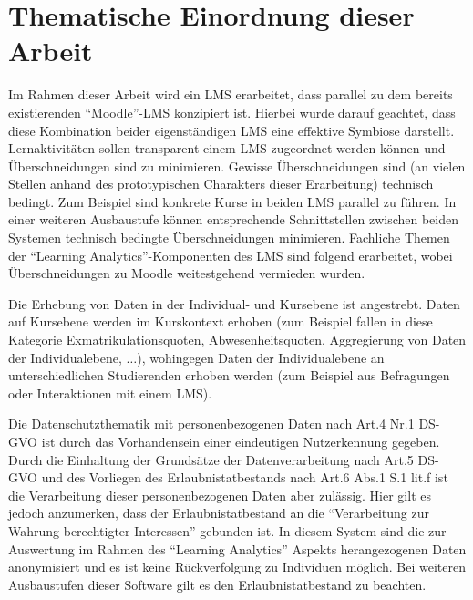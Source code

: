 


\section{Thematische Einordnung dieser Arbeit}


Im Rahmen dieser Arbeit wird ein \ac{LMS} erarbeitet, dass parallel zu dem bereits existierenden \enquote{Moodle}-\ac{LMS} konzipiert ist. Hierbei wurde darauf geachtet, dass diese Kombination beider eigenständigen \ac{LMS} eine effektive Symbiose darstellt. Lernaktivitäten sollen transparent einem \ac{LMS} zugeordnet werden können und Überschneidungen sind zu minimieren. Gewisse Überschneidungen sind (an vielen Stellen anhand des prototypischen Charakters dieser Erarbeitung) technisch bedingt. Zum Beispiel sind konkrete Kurse in beiden \ac{LMS} parallel zu führen. In einer weiteren Ausbaustufe können entsprechende Schnittstellen zwischen beiden Systemen technisch bedingte Überschneidungen minimieren. Fachliche Themen der \enquote{Learning Analytics}-Komponenten des \ac{LMS} sind folgend erarbeitet, wobei Überschneidungen zu Moodle weitestgehend vermieden wurden. 

Die Erhebung von Daten in der Individual- und Kursebene ist angestrebt. Daten auf Kursebene werden im Kurskontext erhoben (zum Beispiel fallen in diese Kategorie Exmatrikulationsquoten, Abwesenheitsquoten, Aggregierung von Daten der Individualebene, $\ldots$), wohingegen Daten der Individualebene an unterschiedlichen Studierenden erhoben werden (zum Beispiel aus Befragungen oder Interaktionen mit einem \ac{LMS}).

Die Datenschutzthematik mit personenbezogenen Daten nach Art.4 Nr.1 DS-GVO ist durch das Vorhandensein einer eindeutigen Nutzerkennung gegeben. Durch die Einhaltung der Grundsätze der Datenverarbeitung nach Art.5 DS-GVO und des Vorliegen des Erlaubnistatbestands nach Art.6 Abs.1 S.1 lit.f ist die Verarbeitung dieser personenbezogenen Daten aber  zulässig. Hier gilt es jedoch anzumerken, dass der Erlaubnistatbestand an die \enquote{Verarbeitung zur Wahrung berechtigter Interessen} gebunden ist. In diesem System sind die zur Auswertung im Rahmen des \enquote{Learning Analytics} Aspekts herangezogenen Daten anonymisiert und es ist keine Rückverfolgung zu Individuen möglich. Bei weiteren Ausbaustufen dieser Software gilt es den Erlaubnistatbestand zu beachten. 

